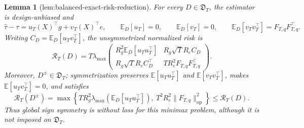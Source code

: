 \documentclass{article}
\newtheorem{lemma}{Lemma}
\begin{document}
\begin{lemma}[lem:balanced-exact-risk-reduction]\label{lem:balanced-exact-risk-reduction}
For every \(D\in\mathfrak D_T\), the estimator is design-unbiased and
\[
\widehat\tau-\tau=u_T(X)^{\top}g+v_T(X)^{\top}e,
\qquad
\mathbb E_D[u_T]=0,
\qquad
\mathbb E_D[v_T]=0,
\qquad
\mathbb E_D[v_Tv_T^{\top}]=F_{T,q}F_{T,q}^{\top}.
\]
Writing \(C_D=\mathbb E_D[u_Tv_T^{\top}]\), the unsymmetrized normalized risk is
\[
\mathcal R_T(D)
=T\lambda_{\max}\!\begin{pmatrix}
R_g^2\mathbb E_D[u_Tu_T^{\top}]&R_g\sqrt T R_e C_D\\
R_g\sqrt T R_e C_D^{\top}&T R_e^2F_{T,q}F_{T,q}^{\top}
\end{pmatrix}.
\]
Moreover, \(D^{\pm}\in\mathfrak D_T\); symmetrization preserves \(\mathbb E[u_Tu_T^{\top}]\) and \(\mathbb E[v_Tv_T^{\top}]\), makes \(\mathbb E[u_Tv_T^{\top}]=0\), and satisfies
\[
\mathcal R_T(D^{\pm})
=\max\!\left\{T R_g^2\lambda_{\max}(\mathbb E_D[u_Tu_T^{\top}]),\ T^2R_e^2\lVert F_{T,q}\rVert_{\mathrm{op}}^2\right\}
\le \mathcal R_T(D).
\]
Thus global sign symmetry is without loss for this minimax problem, although it is not imposed on \(\mathfrak D_T\).
\end{lemma}
\end{document}
